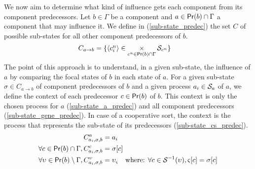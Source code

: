 We now aim to determine what kind of influence gets each component from its component predecessors. %
Let $b \in \Gamma$ be a component and $a \in \mathsf{Pr}(b) \cap \Gamma$ a component that may influence it. We define in (\ref{sub-state_predec}) the set $C$ of possible sub-states for all other component predecessors of $b$.
\begin{align}
\label{sub-state_predec}
  C_{a \rightarrow b} &= \{\mbox{$\langle c^n_i \rangle$} \in \mathop{\times}_{c^n \in \mathsf{Pr}(b) \cap \Gamma} \mathcal{S}_{c^n}\}
\end{align}
The point of this approach is to understand, in a given sub-state, the influence of $a$ by comparing the focal states of $b$ in each state of $a$. For a given sub-state $\sigma \in C_{a \rightarrow b}$ of component predecessors of $b$ and a given process $a_i \in \mathcal{S}_a$ of $a$, we define the context of each predecessor $c \in \mathsf{Pr}(b)$ of $b$. This context is only the chosen process for $a$ (\ref{sub-state_a_predec}) and all component predecessors (\ref{sub-state_gene_predec}). In case of a cooperative sort, the context is the process that represents the sub-state of its predecessors (\ref{sub-state_cs_predec}).
\begin{align}
\label{sub-state_a_predec}
  C^{a}_{a_i,\sigma,b} &= a_i \\
\label{sub-state_gene_predec}
  \forall c \in \mathsf{Pr}(b) \cap \Gamma, C^{c}_{a_i,\sigma,b} &= {\sigma[c]} \\
\label{sub-state_cs_predec}
  \forall \upsilon \in \mathsf{Pr}(b) \setminus \Gamma, C^{\upsilon}_{a_i,\sigma,b} &= \upsilon_\varsigma \quad \text{where: } \forall c \in \mathcal{S}^{-1}(\upsilon), {\varsigma[c]} = {\sigma[c]}
\end{align}


